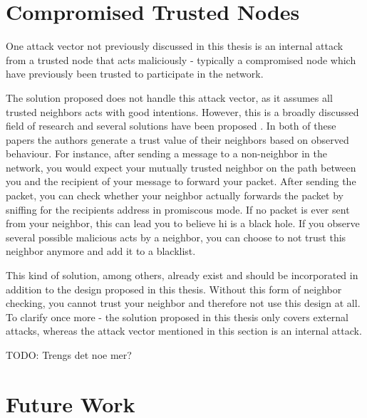 \section{Compromised Trusted Nodes}
One attack vector not previously discussed in this thesis is an internal attack
from a trusted node that acts maliciously - typically a compromised node which
have previously been trusted to participate in the network.

The solution proposed does not handle this attack vector, as it assumes all
trusted neighbors acts with good intentions. However, this is a broadly
discussed field of research and several solutions have been proposed
\cite{Pirzada_McDonald} \cite{dhurandher2010network}. In both of these papers
the authors generate a trust value of their neighbors based on observed
behaviour. For instance, after sending a message to a non-neighbor in the
network, you would expect your mutually trusted neighbor on the path between
you and the recipient of your message to forward your packet. After sending the
packet, you can check whether your neighbor actually forwards the packet by
sniffing for the recipients address in promiscous mode. If no packet is ever
sent from your neighbor, this can lead you to believe hi is a black hole. If you
observe several possible malicious acts by a neighbor, you can choose to not
trust this neighbor anymore and add it to a blacklist.

This kind of solution, among others, already exist and should be incorporated in
addition to the design proposed in this thesis. Without this form of neighbor
checking, you cannot trust your neighbor and therefore not use this design at
all. To clarify once more - the solution proposed in this thesis only covers
external attacks, whereas the attack vector mentioned in this section is an
internal attack.

TODO: Trengs det noe mer?

\section{Future Work}

